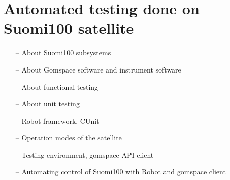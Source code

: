 \documentclass[english,12pt,a4paper,pdftex,elec,utf8]{aaltothesis}
\begin{document}



\clearpage

\section{Automated testing done on Suomi100 satellite}
\begin{itemize}
\item[--]About Suomi100 subsystems
\item[--]About Gomspace software and instrument software
\item[--]About functional testing
\item[--]About unit testing
\item[--]Robot framework, CUnit
\item[--]Operation modes of the satellite
\item[--]Testing environment, gomspace API client
\item[--]Automating control of Suomi100 with Robot and gomspace client
\end{itemize}
 

\clearpage
\end{document}
